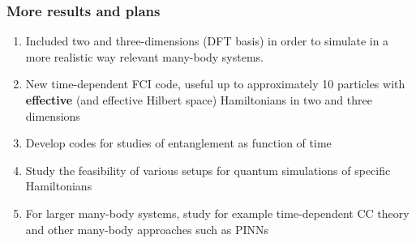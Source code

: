 \documentclass{beamer}
\begin{document}
\begin{frame}
\frametitle{More results and plans}

\begin{enumerate}
\item Included  two and three-dimensions (DFT basis) in order to simulate in  a more realistic way relevant many-body systems.

\item New time-dependent FCI code, useful up to approximately 10 particles with \textbf{effective} (and effective Hilbert space) Hamiltonians in two and three dimensions

\item Develop codes for studies of entanglement as function of time


\item Study the feasibility of various setups for quantum simulations of specific Hamiltonians

\item For larger many-body systems, study for example time-dependent CC theory and other many-body approaches  such as PINNs
\end{enumerate}

\noindent
\end{frame}
\end{document}
